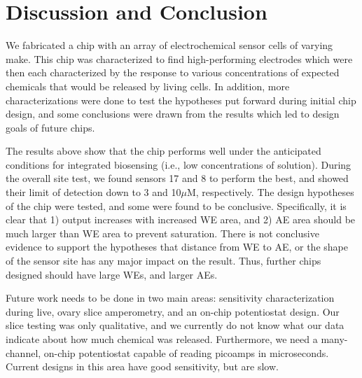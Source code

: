 \chapter{Discussion and Conclusion}

We fabricated a chip with an array of electrochemical sensor cells of varying make. This chip was characterized to find high-performing electrodes which were then each characterized by the response to various concentrations of expected chemicals that would be released by living cells. In addition, more characterizations were done to test the hypotheses put forward during initial chip design, and some conclusions were drawn from the results which led to design goals of future chips.

The results above show that the chip performs well under the anticipated conditions for integrated biosensing (i.e., low concentrations of solution). During the overall site test, we found sensors 17 and 8 to perform the best, and showed their limit of detection down to 3 and 10$\mu \mathrm{M}$, respectively. The design hypotheses of the chip were tested, and some were found to be conclusive. Specifically, it is clear that 1) output increases with increased WE area, and 2) AE area should be much larger than WE area to prevent saturation. There is not conclusive evidence to support the hypotheses that distance from WE to AE, or the shape of the sensor site has any major impact on the result. Thus, further chips designed should have large WEs, and larger AEs.

Future work needs to be done in two main areas: sensitivity characterization during live, ovary slice amperometry, and an on-chip potentiostat design. Our slice testing was only qualitative, and we currently do not know what our data indicate about how much chemical was released. Furthermore, we need a many-channel, on-chip potentiostat capable of reading picoamps in microseconds. Current designs in this area have good sensitivity, but are slow.
